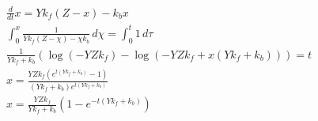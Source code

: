 \begin{align}
  \frac{d}{d t} x = Y k_{f} \left(Z - x\right) - k_{b} x \\
  \int_{0}^{x} \frac{1}{Y k_{f} \left(Z - \chi\right) - \chi k_{b}}\, d\chi = \int_{0}^{t} 1\, d\tau \\
  \frac{1}{Y k_{f} + k_{b}} \left(\log{\left (- Y Z k_{f} \right )} - \log{\left (- Y Z k_{f} + x \left(Y k_{f} + k_{b}\right) \right )}\right) = t \\
  x = \frac{Y Z k_{f} \left(e^{t \left(Y k_{f} + k_{b}\right)} - 1\right)}{\left(Y k_{f} + k_{b}\right) e^{t \left(Y k_{f} + k_{b}\right)}} \\
  x = \frac{Y Z k_{f}}{Y k_{f} + k_{b}} \left(1 - e^{- t \left(Y k_{f} + k_{b}\right)}\right)
\end{align}
